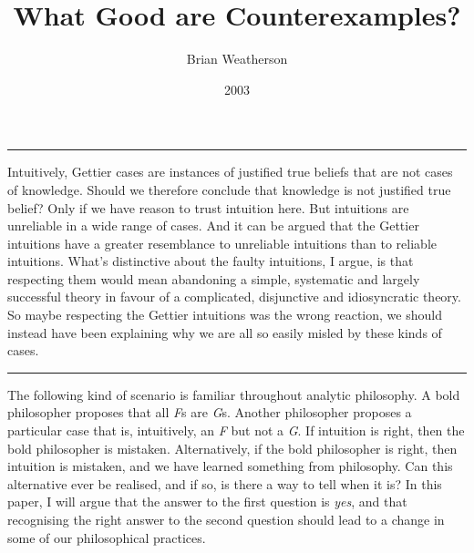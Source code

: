 \documentclass[
  10pt,
  letterpaper,
  DIV=11,
  numbers=noendperiod,
  twoside]{scrartcl}
\title{What Good are Counterexamples?}
\author{Brian Weatherson}
\date{2003}
\renewenvironment{abstract}
 {\vspace{-1.25cm}
 \quotation\small\noindent\rule{\linewidth}{.5pt}\par\smallskip
 \noindent }
 {\par\noindent\rule{\linewidth}{.5pt}\endquotation}
\begin{document}
\maketitle
\begin{abstract}
Intuitively, Gettier cases are instances of justified true beliefs that
are not cases of knowledge. Should we therefore conclude that knowledge
is not justified true belief? Only if we have reason to trust intuition
here. But intuitions are unreliable in a wide range of cases. And it can
be argued that the Gettier intuitions have a greater resemblance to
unreliable intuitions than to reliable intuitions. What's distinctive
about the faulty intuitions, I argue, is that respecting them would mean
abandoning a simple, systematic and largely successful theory in favour
of a complicated, disjunctive and idiosyncratic theory. So maybe
respecting the Gettier intuitions was the wrong reaction, we should
instead have been explaining why we are all so easily misled by these
kinds of cases.
\end{abstract}


The following kind of scenario is familiar throughout analytic
philosophy. A bold philosopher proposes that all \emph{F}s are
\emph{G}s. Another philosopher proposes a particular case that is,
intuitively, an \emph{F} but not a \emph{G}. If intuition is right, then
the bold philosopher is mistaken. Alternatively, if the bold philosopher
is right, then intuition is mistaken, and we have learned something from
philosophy. Can this alternative ever be realised, and if so, is there a
way to tell when it is? In this paper, I will argue that the answer to
the first question is \emph{yes}, and that recognising the right answer
to the second question should lead to a change in some of our
philosophical practices.
\end{document}

